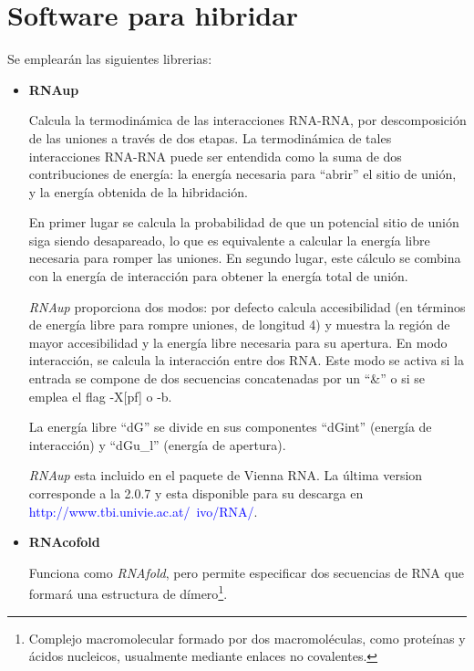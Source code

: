 \documentclass[12pt,a4paper,spanish]{article}
\begin{document}
\section{Software para hibridar}				
Se emplearán las siguientes librerias:
\begin{itemize}
    \item \textbf{RNAup} 
        \par Calcula la termodinámica de las interacciones RNA-RNA, por descomposición de las uniones a
         través de dos etapas. La termodinámica de tales interacciones RNA-RNA puede ser entendida como la 
         suma de dos contribuciones de energía: la energía necesaria para ``abrir'' el sitio de unión, y la
         energía obtenida de la hibridación.

        \par En primer lugar se calcula la probabilidad de que un potencial sitio de unión siga siendo
         desapareado, lo que es equivalente a calcular la energía libre necesaria para romper las uniones. En
         segundo lugar, este cálculo se combina con la energía de interacción para obtener la energía total
         de unión.

        \par \emph{RNAup} proporciona dos modos: por defecto calcula accesibilidad (en términos de energía
         libre para rompre uniones, de longitud 4) y muestra la región de mayor accesibilidad y la energía
         libre necesaria para su apertura. En modo interacción, se calcula la interacción entre dos RNA. Este
         modo se activa si la entrada se compone de dos secuencias concatenadas por un ``\&'' o si se emplea
         el flag -X[pf] o -b.

         \par  La energía libre ``dG'' se divide en sus componentes ``dGint'' (energía de interacción) y
         ``dGu\_l'' (energía de apertura).                      

         \par \emph{RNAup} esta incluido en el paquete de Vienna RNA\cite{11}. La última version corresponde a
         la 2.0.7 y esta disponible para su descarga en
         \textcolor{blue}{http://www.tbi.univie.ac.at/~ivo/RNA/}.

    \item \textbf{RNAcofold} 
            \par Funciona como \emph{RNAfold}, pero permite especificar dos secuencias de RNA que formará una
            estructura de dímero\footnote{Complejo macromolecular formado por dos macromoléculas, como
            proteínas y ácidos nucleicos, usualmente mediante enlaces no covalentes.}.


\end{itemize}
\end{document}

